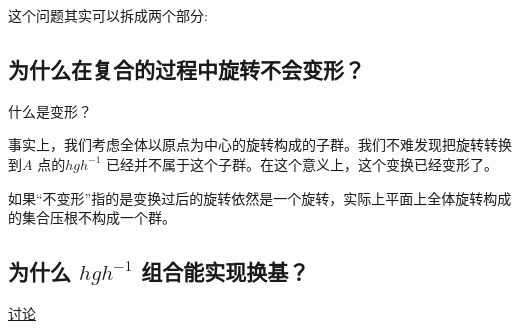 这个问题其实可以拆成两个部分:
\subsection{为什么在复合的过程中旋转不会变形？}
什么是变形？

事实上，我们考虑全体以原点为中心的旋转构成的子群。我们不难发现把旋转转换到\(A\) 点的\(hgh^{-1}\)
已经并不属于这个子群。在这个意义上，这个变换已经变形了。

如果``不变形''指的是变换过后的旋转依然是一个旋转，实际上平面上全体旋转构成的集合压根不构成一个群。

\subsection{为什么 \(hgh^{-1}\) 组合能实现换基？}

\href{https://math.stackexchange.com/questions/11971/intuition-behind-conjugation-in-group-theory}{讨论}
